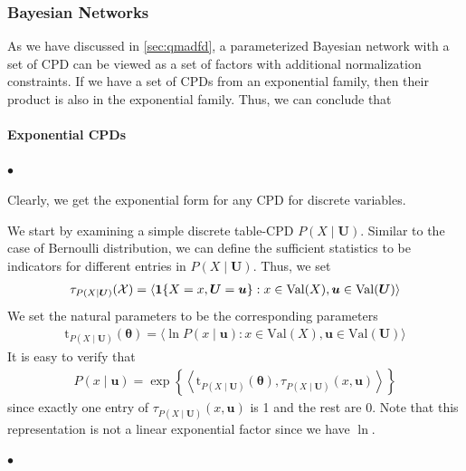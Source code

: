 \documentclass{article}
\begin{document}
\subsubsection{Bayesian Networks}
As we have discussed in \cref{sec:qmadfd}, a parameterized Bayesian network with a set of CPD can be viewed as a set of factors with additional normalization constraints. If we have a set of CPDs from an exponential family, then their product is also in the exponential family. Thus, we can conclude that 
\paragraph{Exponential CPDs}
$\bullet$ 

Clearly, we get the exponential form for any CPD for discrete variables. 
\begin{exma}
We start by examining a simple discrete table-CPD $P(X \mid \boldsymbol{U})$. Similar to the case of Bernoulli distribution, we can define the sufficient statistics to be indicators for different entries in $P(X \mid \boldsymbol{U})$. Thus, we set
\begin{align*}
\tau_{P(X \mid \boldsymbol{U})}(\mathcal{X})=\langle\indicate{X=x, \boldsymbol{U}=\boldsymbol{u}}: x \in \mathrm{Val}(X), \boldsymbol{u} \in \mathrm{Val}(\boldsymbol{U})\rangle
\end{align*}
We set the natural parameters to be the corresponding parameters
\begin{align*}
\mathrm{t}_{P(X \mid \boldsymbol{U})}(\boldsymbol{\theta})=\langle\ln P(x \mid \boldsymbol{u}): x \in \mathrm{Val}(X), \boldsymbol{u} \in \mathrm{Val}(\boldsymbol{U})\rangle
\end{align*}
It is easy to verify that
\begin{align*}
P(x \mid \boldsymbol{u})=\exp \left\{\left\langle\mathrm{t}_{P(X \mid \boldsymbol{U})}(\boldsymbol{\theta}), \tau_{P(X \mid \boldsymbol{U})}(x, \boldsymbol{u})\right\rangle\right\}
\end{align*}
since exactly one entry of $\tau_{P(X \mid \boldsymbol{U})}(x, \boldsymbol{u})$ is 1 and the rest are $0$. Note that this representation is not a linear exponential factor since we have $\ln$.
\end{exma}

$\bullet$ 
\end{document}
